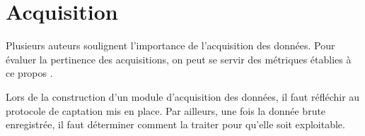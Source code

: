 \section{Acquisition}

Plusieurs auteurs soulignent l'importance de l'acquisition des données. Pour évaluer la pertinence des acquisitions, on peut se servir des métriques établies à ce propos \cite{giotWeb}.

Lors de la construction d'un module d'acquisition des données, il faut réfléchir au protocole de captation mis en place. Par ailleurs, une fois la donnée brute enregistrée, il faut déterminer comment la traiter pour qu'elle soit exploitable.




